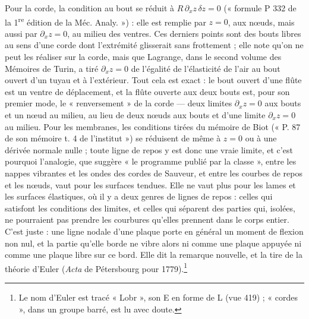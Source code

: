 \documentclass[11pt,a4paper]{article}
\begin{document}
Pour la corde, la condition au bout se réduit à $R\,\partial_x z\,\delta z = 0$
(« formule P 332 de la 1\textsuperscript{re} édition de la Méc. Analy. ») : elle est
remplie par $z = 0$, aux nœuds, mais aussi par $\partial_x z = 0$, au milieu des
ventres. Ces derniers points sont des bouts libres au sens d'une corde dont
l'extrémité glisserait sans frottement ; elle note qu'on ne peut les réaliser sur la
corde, mais que Lagrange, dans le second volume des Mémoires de Turin, a tiré
$\partial_x z = 0$ de l'égalité de l'élasticité de l'air au bout ouvert d'un tuyau et
à l'extérieur. Tout cela est exact : le bout ouvert d'une flûte est un ventre de
déplacement, et la flûte ouverte aux deux bouts est, pour son premier mode, le
« renversement » de la corde — deux limites $\partial_x z = 0$ aux bouts et un nœud au
milieu, au lieu de deux nœuds aux bouts et d'une limite $\partial_x z = 0$ au milieu.
Pour les membranes, les conditions tirées du mémoire de Biot (« P. 87 de son mémoire
t. 4 de l'institut ») se réduisent de même à $z = 0$ ou à une dérivée normale nulle ;
toute ligne de repos y est donc une vraie limite, et c'est pourquoi l'analogie, que
suggère « le programme publié par la classe », entre les nappes vibrantes et les ondes
des cordes de Sauveur, et entre les courbes de repos et les nœuds, vaut pour les
surfaces tendues. Elle ne vaut plus pour les lames et les surfaces élastiques, où il y
a deux genres de lignes de repos : celles qui satisfont les conditions des limites, et
celles qui séparent des parties qui, isolées, ne pourraient pas prendre les courbures
qu'elles prennent dans le corps entier. C'est juste : une ligne nodale d'une plaque
porte en général un moment de flexion non nul, et la partie qu'elle borde ne vibre
alors ni comme une plaque appuyée ni comme une plaque libre sur ce bord. Elle dit la
remarque nouvelle, et la tire de la théorie d'Euler (\emph{Acta} de Pétersbourg pour
1779).\footnote{Le nom d'Euler est tracé « Lobr », son E en forme de L (vue 419) ;
« cordes », dans un groupe barré, est lu avec doute.}
\end{document}
